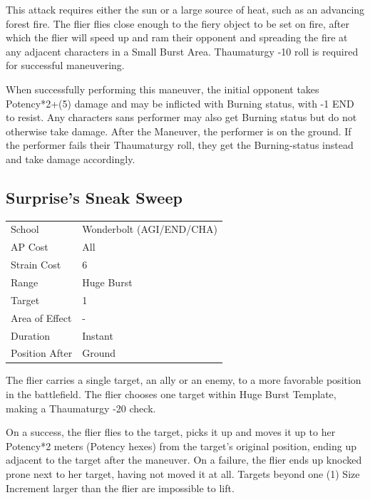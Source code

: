 \documentclass[11pt,a4paper,twocolumn]{book}
\begin{document}
\medskip

This attack requires either the sun or a large source of heat, such as an advancing forest fire. The flier flies close enough to the fiery object to be set on fire, after which the flier will speed up and ram their opponent and spreading the fire at any adjacent characters in a Small Burst Area. Thaumaturgy -10 roll is required for successful maneuvering.

When successfully performing this maneuver, the initial opponent takes Potency*2+(5) damage and may be inflicted with Burning status, with -1 END to resist. Any characters sans performer may also get Burning status but do not otherwise take damage. After the Maneuver, the performer is on the ground. If the performer fails their Thaumaturgy roll, they get the Burning-status instead and take damage accordingly.


\subsection*{Surprise's Sneak Sweep}
{
	\begin{tabu} to 75mm{| X[l,4] | X[l,7] |}
		\hline
		School 			& Wonderbolt (AGI/END/CHA)		\\
        AP Cost	      	& All 				\\
        Strain Cost     & 6 				\\
        Range     		& Huge Burst		\\
        Target      	& 1 				\\
        Area of Effect  & - 	 			\\
        Duration     	& Instant 	 		\\
		Position After  & Ground 			\\ \hline
	\end{tabu}
		
}

\medskip

The flier carries a single target, an ally or an enemy, to a more favorable position in the battlefield. The flier chooses one target within Huge Burst Template, making a Thaumaturgy -20 check.

On a success, the flier flies to the target, picks it up and moves it up to her Potency*2 meters (Potency hexes) from the target's original position, ending up adjacent to the target after the maneuver. On a failure, the flier ends up knocked prone next to her target, having not moved it at all. Targets beyond one (1) Size Increment larger than the flier are impossible to lift.
\end{document}
